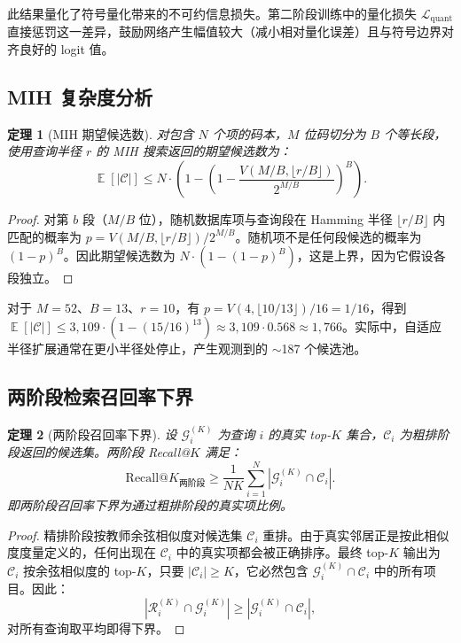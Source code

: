 \documentclass[11pt,a4paper]{article}
\newtheorem{theorem}{定理}
\DeclareMathOperator{\E}{\mathbb{E}}
\begin{document}
此结果量化了符号量化带来的不可约信息损失。第二阶段训练中的量化损失 $\mathcal{L}_{\text{quant}}$ 直接惩罚这一差异，鼓励网络产生幅值较大（减小相对量化误差）且与符号边界对齐良好的 logit 值。

\subsection{MIH 复杂度分析}

\begin{theorem}[MIH 期望候选数]\label{thm:mih-complexity-cn}
对包含 $N$ 个项的码本，$M$ 位码切分为 $B$ 个等长段，使用查询半径 $r$ 的 MIH 搜索返回的期望候选数为：
\begin{equation}
    \E[|\mathcal{C}|] \leq N \cdot \left(1 - \left(1 - \frac{V(M/B, \lfloor r/B \rfloor)}{2^{M/B}}\right)^B\right).
\end{equation}
\end{theorem}

\begin{proof}
对第 $b$ 段（$M/B$ 位），随机数据库项与查询段在 Hamming 半径 $\lfloor r/B \rfloor$ 内匹配的概率为 $p = V(M/B, \lfloor r/B \rfloor) / 2^{M/B}$。随机项不是任何段候选的概率为 $(1-p)^B$。因此期望候选数为 $N \cdot (1 - (1-p)^B)$，这是上界，因为它假设各段独立。
\end{proof}

对于 $M=52$、$B=13$、$r=10$，有 $p = V(4, \lfloor 10/13 \rfloor) / 16 = 1/16$，得到 $\E[|\mathcal{C}|] \leq 3{,}109 \cdot (1 - (15/16)^{13}) \approx 3{,}109 \cdot 0.568 \approx 1{,}766$。实际中，自适应半径扩展通常在更小半径处停止，产生观测到的 $\sim$187 个候选池。


\subsection{两阶段检索召回率下界}

\begin{theorem}[两阶段召回率下界]\label{thm:two-stage-cn}
设 $\mathcal{G}_i^{(K)}$ 为查询 $i$ 的真实 top-$K$ 集合，$\mathcal{C}_i$ 为粗排阶段返回的候选集。两阶段 Recall@$K$ 满足：
\begin{equation}
    \text{Recall@}K_{\text{两阶段}} \geq \frac{1}{NK} \sum_{i=1}^{N} |\mathcal{G}_i^{(K)} \cap \mathcal{C}_i|.
\end{equation}
即两阶段召回率下界为通过粗排阶段的真实项比例。
\end{theorem}

\begin{proof}
精排阶段按教师余弦相似度对候选集 $\mathcal{C}_i$ 重排。由于真实邻居正是按此相似度度量定义的，任何出现在 $\mathcal{C}_i$ 中的真实项都会被正确排序。最终 top-$K$ 输出为 $\mathcal{C}_i$ 按余弦相似度的 top-$K$，只要 $|\mathcal{C}_i| \geq K$，它必然包含 $\mathcal{G}_i^{(K)} \cap \mathcal{C}_i$ 中的所有项目。因此：
\begin{equation}
    |\mathcal{R}_i^{(K)} \cap \mathcal{G}_i^{(K)}| \geq |\mathcal{G}_i^{(K)} \cap \mathcal{C}_i|,
\end{equation}
对所有查询取平均即得下界。
\end{proof}
\end{document}
